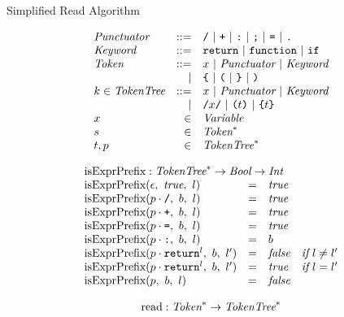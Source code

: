 \documentclass[preprint,10pt]{sigplanconf}
\begin{document}
\begin{displayfigure*}{\label{fig:simpleread}Simplified Read Algorithm}
\begin{minipage}[t]{0.5\linewidth}
\[
\begin{array}{lrl}
  \textit{Punctuator} &::=& \texttt{/} ~|~ \texttt{+} ~|~ \texttt{:} ~|~
  \texttt{;} ~|~ \texttt{=} ~|~ \texttt{.}
  \\
  \textit{Keyword} &::=& \texttt{return} ~|~ \texttt{function}~|~
  \texttt{if}
  \\
   \textit{Token} &::=& x ~|~ \textit{Punctuator} ~|~ \textit{Keyword}
  \\
  &|& \texttt{\{} ~|~ \texttt{(} ~|~ 
  \texttt {\}} ~|~  \texttt{)}
  \\
  k \in \textit{TokenTree} &::=& x ~|~ \textit{Punctuator} ~|~ \textit{Keyword}
  \\
  &|& \texttt{/}x\texttt{/} ~|~ \texttt{(}t\texttt{)} ~|~ \texttt{\{}t\texttt{\}}
  \\
  x &\in& \textit{Variable}
  \\
  s &\in& \textit{Token}^{*}
  \\
  t,p &\in& \textit{TokenTree}^{*}
\end{array}
\]
\end{minipage}
\begin{minipage}[t]{0.5\linewidth}
\[
  \begin{array}{lcll}
    \multicolumn{3}{l}{\textrm{isExprPrefix} : \TT^{*} \rightarrow
      \textit{Bool} \rightarrow \textit{Int}}
    \\
    \isobject(\epsilon,~\textit{true},~l) &=& \textit{true}
    \\
    \isobject(p \cdot \div,~b,~l) &=& \textit{true}
    \\
    \isobject(p \cdot \texttt{+},~b,~l) &=& \textit{true}
    \\
    \isobject(p \cdot \texttt{=},~b,~l) &=& \textit{true}
    \\
    \isobject(p \cdot \texttt{:},~b,~l) &=& b
    \\
    \isobject(p \cdot \texttt{return}^{l},~b,~l') &=& \textit{false} 
    & \textit{if}~l \not = l'
    \\
    \isobject(p \cdot \texttt{return}^{l},~b,~l') &=& \textit{true} 
    & \textit{if}~l = l'
    \\
    \isobject(p ,~b,~l) &=& \textit{false}
    \\
  \end{array}
\]
\end{minipage}
\[
  \begin{array}{lcll}
    \multicolumn{3}{l}{\textrm{read} : \Tok^{*} \rightarrow \TT^{*}
}
\end{array}\]
\end{displayfigure*}
\end{document}
